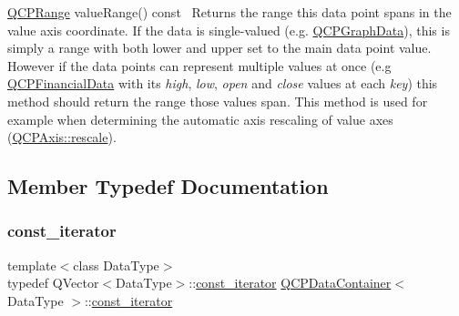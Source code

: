 \begin{DoxyItemize}
\item {\ttfamily \hyperlink{class_q_c_p_range}{Q\+C\+P\+Range} value\+Range() const}~\newline
 Returns the range this data point spans in the value axis coordinate. If the data is single-\/valued (e.\+g. \hyperlink{class_q_c_p_graph_data}{Q\+C\+P\+Graph\+Data}), this is simply a range with both lower and upper set to the main data point value. However if the data points can represent multiple values at once (e.\+g \hyperlink{class_q_c_p_financial_data}{Q\+C\+P\+Financial\+Data} with its {\itshape high}, {\itshape low}, {\itshape open} and {\itshape close} values at each {\itshape key}) this method should return the range those values span. This method is used for example when determining the automatic axis rescaling of value axes (\hyperlink{class_q_c_p_axis_a499345f02ebce4b23d8ccec96e58daa9}{Q\+C\+P\+Axis\+::rescale}). \end{DoxyItemize}


\subsection{Member Typedef Documentation}
\mbox{\label{class_q_c_p_data_container_ae40a91f5cb0bcac61d727427449b7d15}} 
\subsubsection{\texorpdfstring{const\+\_\+iterator}{const\_iterator}}
{\footnotesize\ttfamily template$<$class Data\+Type$>$ \\
typedef Q\+Vector$<$Data\+Type$>$\+::\hyperlink{class_q_c_p_data_container_ae40a91f5cb0bcac61d727427449b7d15}{const\+\_\+iterator} \hyperlink{class_q_c_p_data_container}{Q\+C\+P\+Data\+Container}$<$ Data\+Type $>$\+::\hyperlink{class_q_c_p_data_container_ae40a91f5cb0bcac61d727427449b7d15}{const\+\_\+iterator}}

\mbox{\label{class_q_c_p_data_container_a1bb453c3ae37d1ee5268878acb3a9d29}} 
